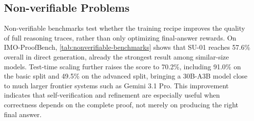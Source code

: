 \documentclass{llmxive}
\providecommand{\arraystretch}{1.14}
\begin{document}
\subsection{Non-verifiable Problems}

Non-verifiable benchmarks test whether the training recipe improves the quality
of full reasoning traces, rather than only optimizing final-answer rewards. On
IMO-ProofBench, \cref{tab:nonverifiable-benchmarks} shows that SU-01 reaches
57.6\% overall in direct generation, already the strongest result among
similar-size models. Test-time scaling further raises the score to 70.2\%,
including 91.0\% on the basic split and 49.5\% on the advanced split, bringing a
30B-A3B model close to much larger frontier systems such as Gemini 3.1 Pro. This improvement indicates
that self-verification and refinement are especially useful when correctness
depends on the complete proof, not merely on producing the right final answer.

\begin{table}[t]
  \centering
  \captionsetup{type=table,hypcap=false}
  \vspace{-0.75em}
  \label{tab:ipho-problems}
  \setlength{\tabcolsep}{3.0pt}
  \renewcommand{\arraystretch}{1.}
  \small
  \vspace{-1.0em}
  
\caption{Performance on physics olympiad problems, averaged over 8 runs. Gold lines for IPhO 2024/2025 are
  20.8/19.7 points. For SU-01, $x/y$ reports scores without and with test-time scaling. 
  }
\end{table}
  
\end{document}
